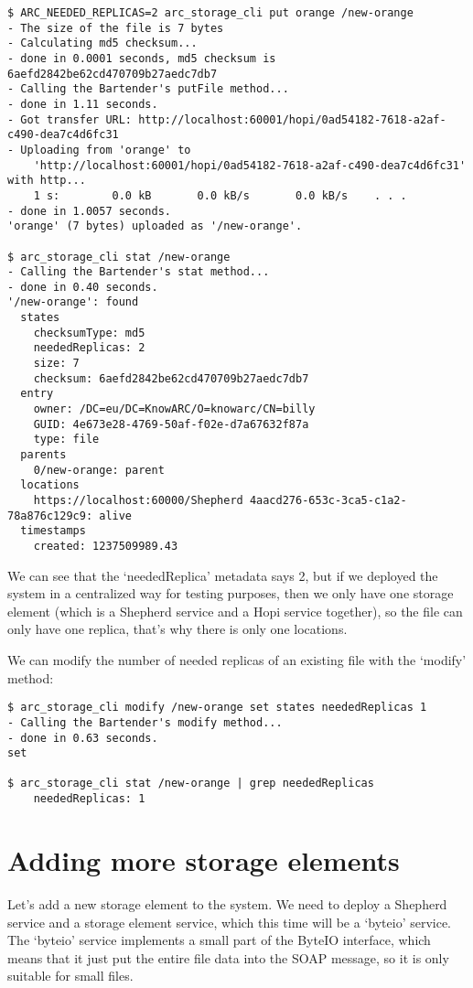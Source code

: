 \documentclass{book}
\begin{document}
\begin{verbatim}
$ ARC_NEEDED_REPLICAS=2 arc_storage_cli put orange /new-orange
- The size of the file is 7 bytes
- Calculating md5 checksum...
- done in 0.0001 seconds, md5 checksum is 6aefd2842be62cd470709b27aedc7db7
- Calling the Bartender's putFile method...
- done in 1.11 seconds.
- Got transfer URL: http://localhost:60001/hopi/0ad54182-7618-a2af-c490-dea7c4d6fc31
- Uploading from 'orange' to
    'http://localhost:60001/hopi/0ad54182-7618-a2af-c490-dea7c4d6fc31' with http...
    1 s:        0.0 kB       0.0 kB/s       0.0 kB/s    . . .       
- done in 1.0057 seconds.
'orange' (7 bytes) uploaded as '/new-orange'.

$ arc_storage_cli stat /new-orange
- Calling the Bartender's stat method...
- done in 0.40 seconds.
'/new-orange': found
  states
    checksumType: md5
    neededReplicas: 2
    size: 7
    checksum: 6aefd2842be62cd470709b27aedc7db7
  entry
    owner: /DC=eu/DC=KnowARC/O=knowarc/CN=billy
    GUID: 4e673e28-4769-50af-f02e-d7a67632f87a
    type: file
  parents
    0/new-orange: parent
  locations
    https://localhost:60000/Shepherd 4aacd276-653c-3ca5-c1a2-78a876c129c9: alive
  timestamps
    created: 1237509989.43

\end{verbatim}

We can see that the `neededReplica' metadata says 2, but if we deployed the system in a centralized way for testing purposes, then we only have one storage element (which is a Shepherd service and a Hopi service together), so the file can only have one replica, that's why there is only one locations.

We can modify the number of needed replicas of an existing file with the `modify' method:

\begin{verbatim}
$ arc_storage_cli modify /new-orange set states neededReplicas 1
- Calling the Bartender's modify method...
- done in 0.63 seconds.
set

$ arc_storage_cli stat /new-orange | grep neededReplicas
    neededReplicas: 1
\end{verbatim}

\section{Adding more storage elements}

Let's add a new storage element to the system. We need to deploy a Shepherd service and a storage element service, which this time will be a `byteio' service. The `byteio' service implements a small part of the ByteIO interface, which means that it just put the entire file data into the SOAP message, so it is only suitable for small files.
\end{document}
